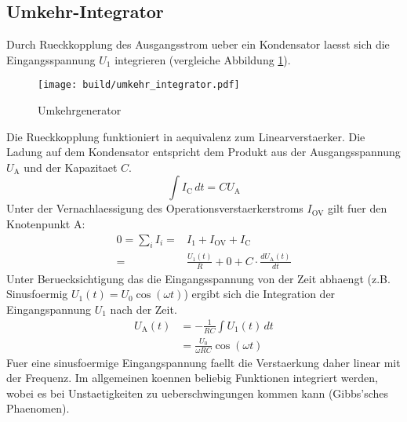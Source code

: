 \subsection{Umkehr-Integrator}%
\label{sub:umkehr_integrator}

Durch Rueckkopplung des Ausgangsstrom ueber ein Kondensator laesst sich die
Eingangsspannung $U_1$ integrieren (vergleiche Abbildung \ref{fig:integrator}).
\begin{figure}[h]
		\centering
		\texttt{[image: build/umkehr\_integrator.pdf]}
		\caption{Umkehrgenerator \cite{anleitung}}
		\label{fig:integrator}
\end{figure}
Die Rueckkopplung funktioniert in aequivalenz zum Linearverstaerker.
Die Ladung auf dem Kondensator entspricht dem Produkt aus der Ausgangsspannung
$U_\text{A}$ und der Kapazitaet $C$.
\begin{equation}
		\int I_\text{C} \, dt = C U_\text{A}
\end{equation}
Unter der Vernachlaessigung des Operationsverstaerkerstroms $I_\text{OV}$ gilt
fuer den Knotenpunkt A:
\begin{align}
		0 = \sum_i I_i =& I_1 + I_\text{OV} + I_\text{C} \\
		=& \frac{U_1(t)}{R} + 0 + C \cdot \frac{d U_\text{A}(t)}{dt}
\end{align}
Unter Beruecksichtigung das die Eingangsspannung von der Zeit abhaengt (z.B.
Sinusfoermig $U_1(t)= U_0 \cos(\omega t)$) ergibt sich die Integration der Eingangspannung $U_1$ nach
der Zeit.
\begin{align}
		U_\text{A}(t) &= - \frac{1}{RC} \int U_\text{1}(t) \, dt \\
				   &= \frac{U_0}{\omega R C} \cos (\omega t)
\end{align}
Fuer eine sinusfoermige Eingangspannung faellt die Verstaerkung daher linear mit 
der Frequenz.
Im allgemeinen koennen beliebig Funktionen integriert werden, wobei es bei
Unstaetigkeiten zu ueberschwingungen kommen kann (Gibbs'sches Phaenomen).

